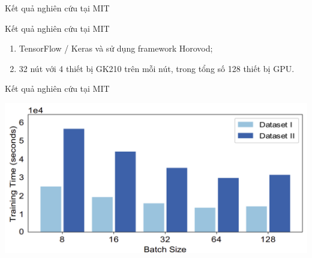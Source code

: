 \documentclass[notheorems,hyperref={bookmarks=true}]{beamer}
\theoremstyle{plain}
\numberwithin{equation}{section}
\begin{document}
\begin{footnotesize}
\begin{frame}{Kết quả nghiên cứu tại MIT}
\end{frame}

\begin{frame}{Kết quả nghiên cứu tại MIT}
\begin{enumerate}[-]
	\item TensorFlow / Keras và sử dụng framework Horovod;
	\item 32 nút với 4 thiết bị GK210 trên mỗi nút, trong tổng số 128 thiết bị GPU.
\end{enumerate}
\end{frame}

\begin{frame}{Kết quả nghiên cứu tại MIT}
\begin{center}
	\includegraphics[scale=0.42]{MIT_1.PNG}
\end{center}
\end{frame}


\end{footnotesize}
\end{document}
